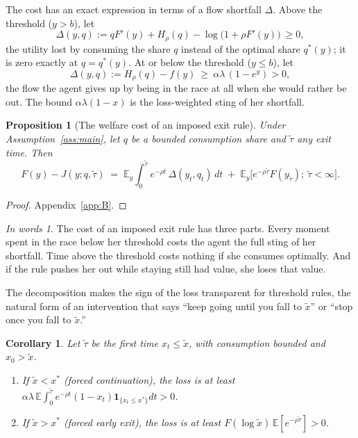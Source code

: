 \documentclass[12pt]{article}
\newtheorem{proposition}{Proposition}
\newtheorem{corollary}{Corollary}
\theoremstyle{definition}
\theoremstyle{remark}
\newtheorem*{inwords}{In words}
\newcommand{\E}{\mathbb{E}}
\theoremstyle{plain}
\theoremstyle{definition}
\begin{document}
The cost has an exact expression in terms of a flow shortfall $\Delta$. Above the threshold ($y>b$), let
\[
\Delta(y,q):=qF'(y)+H_\rho(q)-\log\big(1+\rho F'(y)\big)\ \ge0,
\]
the utility lost by consuming the share $q$ instead of the optimal share $q^*(y)$; it is zero exactly at $q=q^*(y)$. At or below the threshold ($y\le b$), let
\[
\Delta(y,q):=H_\rho(q)-f(y)\ \ge\ \alpha\lambda\,(1-e^{y})>0,
\]
the flow the agent gives up by being in the race at all when she would rather be out. The bound $\alpha\lambda(1-x)$ is the loss-weighted sting of her shortfall.

\begin{proposition}[The welfare cost of an imposed exit rule]\label{prop:welfare}
Under Assumption~\ref{ass:main}, let $q$ be a bounded consumption share and $\tilde\tau$ any exit time. Then
\[
F(y)-J(y;q,\tilde\tau)\;=\;\E_y\int_0^{\tilde\tau}e^{-\rho t}\,\Delta(y_t,q_t)\,dt\;+\;\E_y\big[e^{-\rho\tilde\tau}F(y_{\tilde\tau});\ \tilde\tau<\infty\big].
\]
\end{proposition}

\begin{proof}
Appendix~\ref{app:B}.
\end{proof}

\begin{inwords}
The cost of an imposed exit rule has three parts. Every moment spent in the race below her threshold costs the agent the full sting of her shortfall. Time above the threshold costs nothing if she consumes optimally. And if the rule pushes her out while staying still had value, she loses that value.
\end{inwords}

The decomposition makes the sign of the loss transparent for threshold rules, the natural form of an intervention that says ``keep going until you fall to $\tilde x$'' or ``stop once you fall to $\tilde x$.''

\begin{corollary}\label{cor:welfare}
Let $\tilde\tau$ be the first time $x_t\le\tilde x$, with consumption bounded and $x_0>\tilde x$.
\begin{enumerate}[label=(\alph*)]
\item If $\tilde x<x^*$ (forced continuation), the loss is at least $\alpha\lambda\,\E\int_0^{\tilde\tau}e^{-\rho t}(1-x_t)\mathbf 1_{\{x_t\le x^*\}}dt>0$.
\item If $\tilde x>x^*$ (forced early exit), the loss is at least $F(\log\tilde x)\,\E[e^{-\rho\tilde\tau}]>0$.
\end{enumerate}
\end{corollary}
\end{document}
